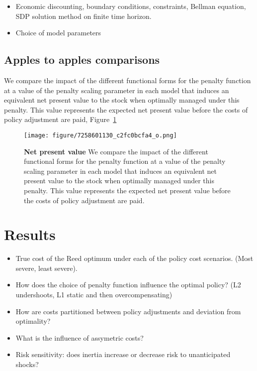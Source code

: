 \documentclass[review, 12pt]{elsarticle}
\begin{document}
\begin{itemize}
\item   Economic discounting, boundary conditions, constraints, Bellman equation, SDP solution method on finite time horizon.  
\item   Choice of model parameters 
\end{itemize}


\subsection{Apples to apples comparisons}

We compare the impact of the different functional forms for the penalty
function at a value of the penalty scaling parameter in each model that
induces an equivalent net present value to the stock when optimally
managed under this penalty. This value represents the expected net
present value before the costs of policy adjustment are paid, Figure~\ref{fig:apples}

  \begin{figure}
    \begin{center}
\texttt{[image: figure/7258601130\_c2fc0bcfa4\_o.png]}
\caption{\textbf{Net present value} We compare the impact of the different functional forms for the penalty
function at a value of the penalty scaling parameter in each model that
induces an equivalent net present value to the stock when optimally
managed under this penalty. This value represents the expected net
present value before the costs of policy adjustment are paid.}
\label{fig:apples}
\end{center}
\end{figure}


\section{Results}

\begin{itemize}
  \item True cost of the Reed optimum under each of the policy cost scenarios.  (Most severe, least severe).   
  \item How does the choice of penalty function influence the optimal policy? (L2 undershoots, L1 static and then overcompensating)
  \item How are costs partitioned between policy adjustments and deviation from optimality? 
  \item What is the influence of assymetric costs?
  \item Risk sensitivity: does inertia increase or decrease risk to unanticipated shocks?
\end{itemize}
\end{document}
